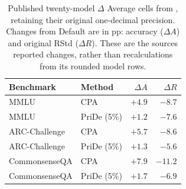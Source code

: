 \begin{table}[htbp]
\centering\small\setlength{\tabcolsep}{4pt}
\caption{Published twenty-model $\Delta$ Average cells from \citet[Table~3, p.~22]{zheng2024robust}, retaining their original one-decimal precision. Changes from Default are in pp: accuracy ($\Delta A$) and original RStd ($\Delta R$). These are the source\textquotesingle s reported changes, rather than recalculations from its rounded model rows.}
\label{tab:rq1-published-changes}
\begin{tabular}{llrr}
\toprule
Benchmark & Method & $\Delta A$ & $\Delta R$\\
\midrule
MMLU & CPA & $+4.9$ & $-8.7$\\
MMLU & PriDe (5\%) & $+1.2$ & $-7.6$\\
ARC-Challenge & CPA & $+5.7$ & $-8.6$\\
ARC-Challenge & PriDe (5\%) & $+1.3$ & $-5.6$\\
CommonsenseQA & CPA & $+7.9$ & $-11.2$\\
CommonsenseQA & PriDe (5\%) & $+1.7$ & $-6.9$\\
\bottomrule
\end{tabular}
\end{table}
